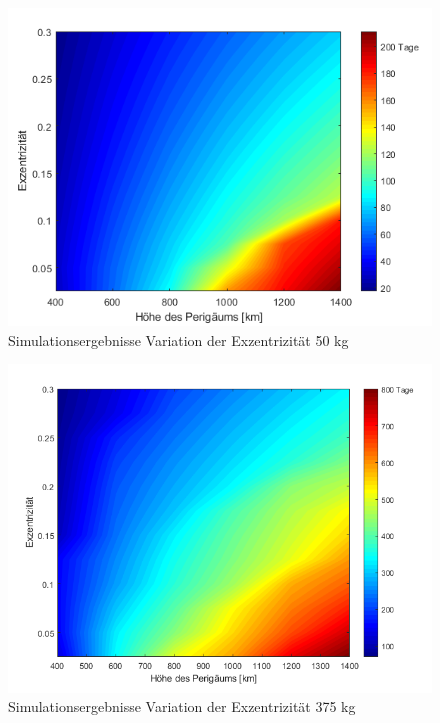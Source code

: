 \begin{figure}[h!]
	\centering
		\includegraphics[width=1.00\textwidth]{./graphics/GMAT/ecc_perigee_50kg.png}
		\caption{Simulationsergebnisse Variation der Exzentrizität 50 kg}
	\label{fig:GMAT_ecc_a}
\end{figure}

\begin{figure}[h!]
	\centering
		\includegraphics[width=1.00\textwidth]{./graphics/GMAT/ecc_perigee_375kg.png}
		\caption{Simulationsergebnisse Variation der Exzentrizität 375 kg}
	\label{fig:GMAT_ecc_b}
\end{figure}


